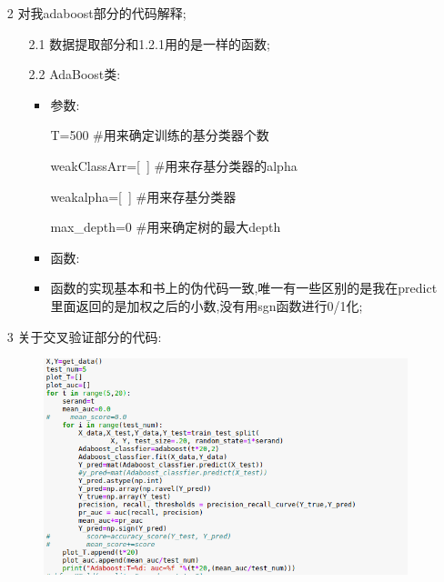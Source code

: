 \documentclass[11pt, a4paper, UTF8]{ctexart}
\begin{document}
\begin{solution}
\begin{enumerate}
\begin{enumerate}
\begin{enumerate}
\begin{itemize}
\newpage
\end{itemize}

\end{enumerate}
\item[2]对我adaboost部分的代码解释;
\begin{enumerate}
\item[2.1]数据提取部分和1.2.1用的是一样的函数;
\item[2.2]AdaBoost类:
\begin{itemize}
\item 参数:

T=500 \#用来确定训练的基分类器个数

weakClassArr=[~] \#用来存基分类器的alpha

weakalpha=[~]    \#用来存基分类器

max\_depth=0     \#用来确定树的最大depth

\item 函数:
\item 函数的实现基本和书上的伪代码一致,唯一有一些区别的是我在predict里面返回的是加权之后的小数,没有用sgn函数进行0/1化;
\end{itemize}
\end{enumerate}
\item[3] 关于交叉验证部分的代码:
\begin{figure}[!htbp]
	\centering
	\includegraphics[scale=0.49]{auc.png}
\end{figure}


\end{enumerate}
\end{enumerate}
\end{solution}
\end{document}
